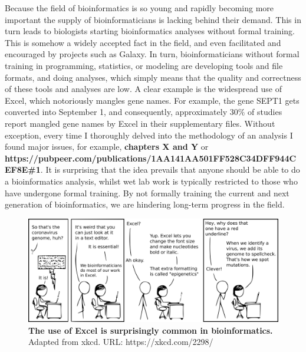 Because the field of bioinformatics is so young and rapidly becoming more important the supply of bioinformaticians is lacking behind their demand. This in turn leads to biologists starting bioinformatics analyses without formal training. This is somehow a widely accepted fact in the field, and even facilitated and encouraged by projects such as Galaxy\cite{galaxy}. In turn, bioinformaticians without formal training in programming, statistics, or modeling are developing tools and file formats, and doing analyses, which simply means that the quality and correctness of these tools and analyses are low. A clear example is the widespread use of Excel, which notoriously mangles gene names\cite{Zeeberg2004}. For example, the gene SEPT1 gets converted into September 1, and consequently, approximately $30\%$ of studies report mangled gene names by Excel in their supplementary files\cite{Abeysooriya2021}. Without exception, every time I thoroughly delved into the methodology of an analysis I found major issues, for example, \textbf{chapters \textbf{X} and Y} or \textbf{https://pubpeer.com/publications/1AA141AA501FF528C34DFF944CEF8E\#1}. It is surprising that the idea prevails that anyone should be able to do a bioinformatics analysis, whilst wet lab work is typically restricted to those who have undergone formal training. By not formally training the current and next generation of bioinformatics, we are hindering long-term progress in the field.

\begin{figure}[H]
    \centering
    \includegraphics[width=0.85\linewidth]{ch.discussion/imgs/xkcd_excel.png}
    \caption{\textbf{The use of Excel is surprisingly common in bioinformatics.} Adapted from xkcd. URL: https://xkcd.com/2298/}
    \label{fig:xkcd_excel}
\end{figure}

